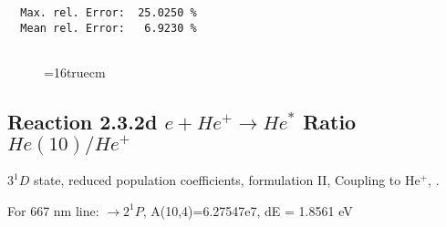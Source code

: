 \documentclass[12pt,dvipdfmx]{article}
\begin{document}
\begin{small}
\begin{verbatim}
  Max. rel. Error:  25.0250 %
  Mean rel. Error:   6.9230 %


\end{verbatim}\end{small}
\begin{figure} \label{2.3.2c}
\epsfxsize=16truecm
\end{figure}
\newpage


\subsection{
  Reaction 2.3.2d $e + He^+ \rightarrow He^*  $ Ratio $He(10)/He^+$
}

  $3^1D$ state,
  reduced population coefficients, formulation II,
  Coupling to He$^+$, \cite{kn:Fujimoto}.

  For 667 nm line: $\rightarrow 2^1P$, A(10,4)=6.27547e7, dE = 1.8561 eV
\end{document}
